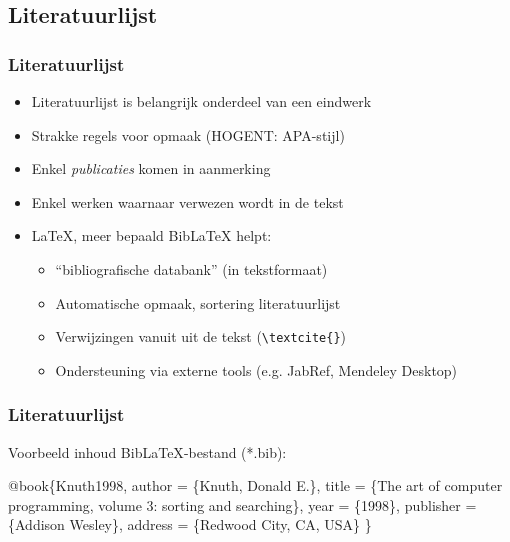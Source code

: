 \documentclass[aspectratio=169]{beamer}
\begin{document}
\subsection{Literatuurlijst}

\begin{frame}[fragile]
 \frametitle{Literatuurlijst}

 \begin{itemize}
   \item<+-> Literatuurlijst is belangrijk onderdeel van een eindwerk
   \item<+-> Strakke regels voor opmaak (HOGENT: APA-stijl)
   \item<+-> Enkel \textit{publicaties} komen in aanmerking
   \item<+-> Enkel werken waarnaar verwezen wordt in de tekst
   \item<+-> {\LaTeX}, meer bepaald Bib{\LaTeX} helpt:
   \begin{itemize}
     \item<+-> ``bibliografische databank'' (in tekstformaat)
     \item<+-> Automatische opmaak, sortering literatuurlijst
     \item<+-> Verwijzingen vanuit uit de tekst (\verb|\textcite{}|)
     \item<+-> Ondersteuning via externe tools (e.g. JabRef, Mendeley Desktop)
   \end{itemize}
 \end{itemize}
\end{frame}

\begin{frame}[fragile]
 \frametitle{Literatuurlijst}

 Voorbeeld inhoud Bib{\LaTeX}-bestand (*.bib):

\begin{semiverbatim}
\alert<2>{@book}\{\alert<4>{Knuth1998},
 \alert<3>{author} = \{Knuth, Donald E.\},
 \alert<3>{title} = \{The art of computer programming,  volume 3:
 sorting and searching\},
 \alert<3>{year} = \{1998\},
 publisher = \{Addison Wesley\},
 address = \{Redwood City, CA, USA\}
\}
\end{semiverbatim}


\end{frame}
\end{document}
